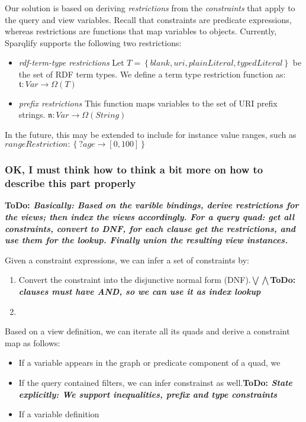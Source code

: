 \documentclass[a4paper,twoside,bibtotoc,abstracton,12pt,BCOR=15mm]{scrreprt}
\newcommand{\todo}[1]{\textbf{ToDo: \textit{#1}}}
\begin{document}
Our solution is based on deriving \emph{restrictions} from the \emph{constraints} that apply to the query and view variables.
Recall that constraints are predicate expressions, whereas restrictions are functions that map variables to objects.
Currently, Sparqlify supports the following two restrictions:
\begin{itemize}
  \item \emph{rdf-term-type restrictions} Let $T = \left \{blank, uri, plainLiteral, typedLiteral \right \}$ be the set of RDF term types. We define
  a term type restriction function as: $\mathfrak{t}: Var \rightarrow \Omega \left ( T  \right)$
  \item \emph{prefix restrictions} This function maps variables to the set of URI prefix strings. $\mathfrak{n}: Var \rightarrow \Omega \left( String \right)$
\end{itemize}
In the future, this may be extended to include for instance value ranges, such as $rangeRestriction: \left \{?age \rightarrow [0, 100] \right\}$ 

\subsubsection{OK, I must think how to think a bit more on how to describe this part properly}
\todo{Basically: Based on the varible bindings, derive restrictions for the views; then index the views accordingly. For a query quad: get all constraints, convert to DNF, for each clause get the restrictions, and use them for the lookup. Finally union the resulting view instances.}

Given a constraint expressions, we can infer a set of constraints by:
\begin{enumerate}
  \item Convert the constraint into the disjunctive normal form (DNF).$\bigvee \bigwedge$\todo{clauses must have AND, so we can use it as index lookup}
  \item  
\end{enumerate}

Based on a view definition, we can iterate all its quads and derive a constraint map as follows:
\begin{itemize}
  \item If a variable appears in the graph or predicate component of a quad, we 
  \item If the query contained filters, we can infer constrainst as well.\todo{State explicitly: We support inequalities, prefix and type constraints} %
  \item If a variable definition 
\end{itemize}
\end{document}
